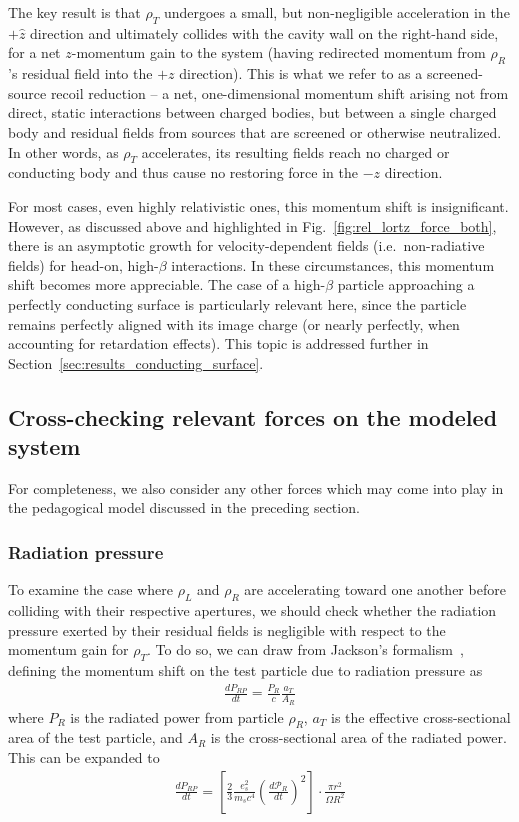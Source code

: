 \documentclass[reprint,
               amsmath,amssymb,nofootinbib, aps%
              ]{revtex4-2}
\begin{document}
The key result is that $\rho_T$ undergoes a small, but non-negligible acceleration in the $+\hat{z}$ direction and ultimately collides with the cavity wall on the right-hand side, for a net $z$-momentum gain to the system (having redirected momentum from $\rho_R$'s residual field into the $+z$ direction). This is what we refer to as a screened-source recoil reduction -- a net, one-dimensional momentum shift arising not from direct, static interactions between charged bodies, but between a single charged body and residual fields from sources that are screened or otherwise neutralized. In other words, as $\rho_T$ accelerates, its resulting fields reach no charged or conducting body and thus cause no restoring force in the $-z$ direction.

For most cases, even highly relativistic ones, this momentum shift is insignificant. However, as discussed above and highlighted in Fig.~\ref{fig:rel_lortz_force_both}, there is an asymptotic growth for velocity-dependent fields (i.e.~non-radiative fields) for head-on, high-$\beta$ interactions. In these circumstances, this momentum shift becomes more appreciable. The case of a high-$\beta$ particle approaching a perfectly conducting surface is particularly relevant here, since the particle remains perfectly aligned with its image charge (or nearly perfectly, when accounting for retardation effects). This topic is addressed further in Section~\ref{sec:results_conducting_surface}.

\subsection{Cross-checking relevant forces on the modeled system}
\vspace{-0.2cm}
For completeness, we also consider any other forces which may come into play in the pedagogical model discussed in the preceding section. 
\vspace{-0.2cm}
\subsubsection*{Radiation pressure}
\vspace{-0.2cm}
To examine the case where $\rho_L$ and $\rho_R$ are accelerating toward one another before colliding with their respective apertures, we should check whether the radiation pressure exerted by their residual fields is negligible with respect to the momentum gain for $\rho_T$. To do so, we can draw from Jackson's formalism~\cite{jackson2012classical}, defining the momentum shift on the test particle due to radiation pressure as
\begin{align}
    \frac{dP_{RP}}{dt} = \frac{P_R}{c} \frac{a_T}{A_R}
\end{align}
where $P_R$ is the radiated power from particle $\rho_R$, $a_T$ is the effective cross-sectional area of the test particle, and $A_R$ is the cross-sectional area of the radiated power. This can be expanded to  
\begin{align}
    \frac{dP_{RP}}{dt} = \left[\frac{2}{3}\frac{e_s^2}{m_s c^4} \left(\frac{d\mathcal{P}_R}{dt}\right)^2\right] \cdot \frac{\pi r^2}{\Omega R^2}
\end{align}
\end{document}
